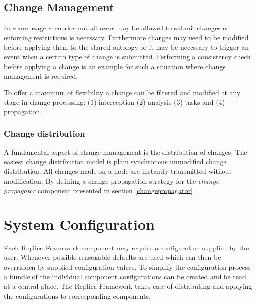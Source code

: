 \subsection{Change Management}
\label{changemanagement_behave}
In some usage scenarios not all users may be allowed to submit changes or
enforcing restrictions is necessary. Furthermore changes may need to
be modified before applying them to the shared ontology or it may be necessary
to trigger an event when a certain type of change is submitted.
Performing a consistency check before applying a change is an example for
such a situation where change management is required.

To offer a maximum of flexibility a change can be filtered and modified
at any stage in change processing: (1) interception (2) analysis (3) tasks
and (4) propagation.

\subsubsection{Change distribution}
A fundamental aspect of change management is the distribution of changes.
The easiest change distribution model is plain synchronous unmodified change
distribution. All changes made on a node are instantly transmitted without
modification. By defining a change propagation strategy for the
\emph{change propagator} component presented in section \ref{changepropagator}.


\section{System Configuration}
Each Replica Framework component may require a configuration supplied by the user.
Whenever possible reasonable defaults are used which can then be overridden by
supplied configuration values. To simplify the configuration process a bundle
of the individual component configurations can be created and be read at
a central place. The Replica Framework takes care of distributing and applying
the configurations to corresponding components.

